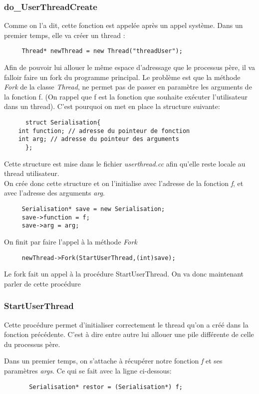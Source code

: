\documentclass[a4paper,10pt]{report}
\begin{document}
    \textcolor{TealBlue}{\subsubsection*{do\_UserThreadCreate}}
      Comme on l'a dit, cette fonction est appelée après un appel système. Dans un premier temps, elle va créer un thread :
	\begin{lstlisting}
	 Thread* newThread = new Thread("threadUser");
	\end{lstlisting}
     Afin de pouvoir lui allouer le même espace d'adressage que le processus père, il va falloir faire un fork du programme principal.
     Le problème est que la méthode \emph{Fork} de la classe \emph{Thread}, ne permet pas de passer en paramètre les arguments de la fonction f.
     (On rappel que f est la fonction que souhaite exécuter l'utilisateur dans un thread). C'est pourquoi on met en place la structure suivante:
     \begin{lstlisting}
      struct Serialisation{
	int function; // adresse du pointeur de fonction
	int arg; // adresse du pointeur des arguments
      };
     \end{lstlisting}
    Cette structure est mise dans le fichier \emph{userthread.cc} afin qu'elle reste locale au thread utilisateur.\\

    On crée donc cette structure et on l'initialise avec l'adresse de la fonction \emph{f}, et avec l'adresse des arguments \emph{arg}.
    \begin{lstlisting}
     Serialisation* save = new Serialisation;
     save->function = f;
     save->arg = arg;
    \end{lstlisting}
    On finit par faire l'appel à la méthode \emph{Fork}
    \begin{lstlisting}
     newThread->Fork(StartUserThread,(int)save);
    \end{lstlisting}
    Le fork fait un appel à la procédure StartUserThread. On va donc maintenant parler de cette procédure
    \newpage
    \textcolor{TealBlue}{\subsubsection*{StartUserThread}}
      Cette procédure permet d'initialiser correctement le thread qu'on a créé dans la fonction précédente. C'est à dire entre autre lui allouer une pile différente de
      celle du processus père.
      
      Dans un premier temps, on s'attache à récupérer notre fonction \emph{f} et ses paramètres \emph{args}. Ce qui se fait avec la ligne ci-dessous:
      \begin{lstlisting}
       Serialisation* restor = (Serialisation*) f;
      \end{lstlisting}
      
\end{document}
